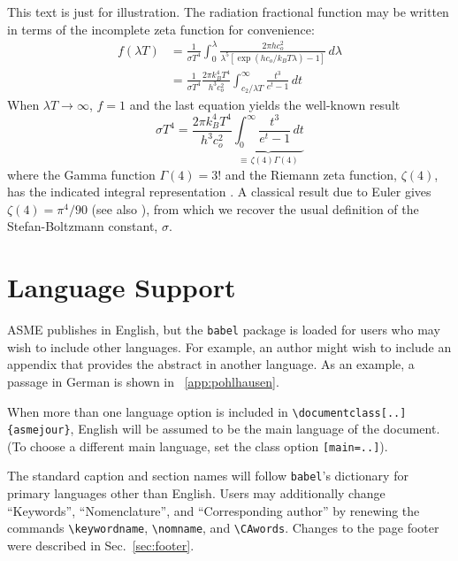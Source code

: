 \documentclass[balance,nocopyright,upint,varvw,hyphenate,barcolor=Goldenrod3,german]{asmejour}%
\begin{document}
This text is just for illustration. The radiation fractional function may be written in terms of the incomplete zeta function for convenience:
\begin{align}
f(\lambda T)  &=  \frac{1}{\sigma T^4} \int_0^\lambda\frac{2\pi h c_o^2}{\lambda^5 \left[ \exp (h c_o/k_B T \lambda) - 1\right] } \, d\lambda \\
              &=  \frac{1}{\sigma T^4}\frac{2\pi k_B^4 T^4}{h^3c_o^2}\int^\infty_{c_2/\lambda T}\frac{t^3}{e^t -1}\, dt\label{eqn:zeta}
\end{align}
When $\lambda T \rightarrow \infty$, $f = 1$ and the last equation yields the well-known result
\begin{equation}
\sigma T^4 =\frac{2\pi k_B^4 T^4}{h^3c_o^2} \underbrace{\int_0^\infty \frac{t^3}{e^t - 1} \, dt}_{\equiv\mspace{2mu} \zeta(4)\Gamma(4)}
\end{equation}
where the Gamma function $\Gamma(4) = 3!$ and the Riemann zeta function, $\zeta(4)$, has the indicated integral representation \cite[\S13.12]{ww1927}.  A classical result due to Euler \cite{euler1740} gives $\zeta(4) = \pi^4/90$ (see also \cite[\S167]{euler1748}), from which we recover the usual definition of the  Stefan-Boltzmann constant, $\sigma$.


\section{Language Support\label{app:language}}

ASME publishes in English, but the \texttt{babel} package is loaded for users who may wish to include other languages.
For example, an author might wish to include an appendix that provides the abstract in another language. As an example,
a passage in German is shown in \appendixname~\ref{app:pohlhausen}.

When more than one language option is included in \verb|\documentclass[..]{asmejour}|, English will be
assumed to be the main language of the document. (To choose a different main language, set the class option \texttt{[main=..]}).

The standard caption and section names will follow \texttt{babel}'s dictionary for primary languages other than English.  Users may additionally change ``Keywords'', ``Nomenclature'', and  ``Corresponding author'' by renewing the commands \verb|\keywordname|, \verb|\nomname|, and \verb|\CAwords|. Changes to the page footer were described in Sec.~\ref{sec:footer}.
\end{document}
